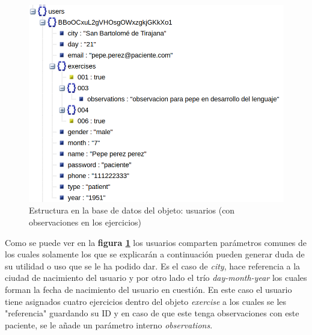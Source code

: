 \medskip
\begin{figure}
    \includegraphics[width=\linewidth]{./images/database/users-patient-with-observations-database.png}
    \caption{Estructura en la base de datos del objeto: usuarios (con observaciones en los ejercicios)}
    \label{usuario-con-observaciones}
\end{figure}

Como se puede ver en la \textbf{figura \ref{usuario-con-observaciones}}
los usuarios comparten parámetros comunes de los cuales solamente los que
se explicarán a continuación pueden generar duda de su utilidad o uso que se
le ha podido dar. Es el caso de \textit{city}, hace referencia a la ciudad de
nacimiento del usuario y por otro lado el trío \textit{day-month-year} los
cuales forman la fecha de nacimiento del usuario en cuestión.
En este caso el usuario tiene asignados cuatro ejercicios dentro del objeto
\textit{exercise} a los cuales se les "referencia" guardando su ID y en caso
de que este tenga observaciones con este paciente, se le añade un parámetro
interno \textit{observations}.


